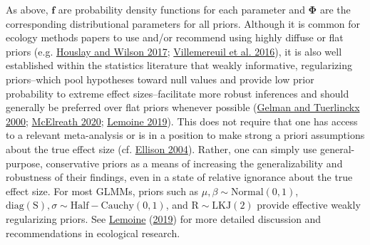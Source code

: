 \documentclass{article}
\begin{document}
As above, \(\boldsymbol{f}\) are probability density functions for each
parameter and \(\boldsymbol{\Phi}\) are the corresponding distributional
parameters for all priors. Although it is common for ecology methods
papers to use and/or recommend using highly diffuse or flat priors (e.g.
\protect\hyperlink{ref-Hous2017}{Houslay and Wilson 2017};
\protect\hyperlink{ref-Vill2016}{Villemereuil et al. 2016}), it is also
well established within the statistics literature that weakly
informative, regularizing priors--which pool hypotheses toward null
values and provide low prior probability to extreme effect
sizes--facilitate more robust inferences and should generally be
preferred over flat priors whenever possible
(\protect\hyperlink{ref-Gelman2000}{Gelman and Tuerlinckx 2000};
\protect\hyperlink{ref-Rethinking}{McElreath 2020};
\protect\hyperlink{ref-Lemoine2019}{Lemoine 2019}). This does not
require that one has access to a relevant meta-analysis or is in a
position to make strong a priori assumptions about the true effect size
(cf. \protect\hyperlink{ref-Ellison2004}{Ellison 2004}). Rather, one can
simply use general-purpose, conservative priors as a means of increasing
the generalizability and robustness of their findings, even in a state
of relative ignorance about the true effect size. For most GLMMs, priors
such as \(\mu,\beta \sim \mathrm{Normal}(0,1)\),
\(\mathrm{diag}(\boldsymbol{\mathrm{S}}),\sigma \sim \mathrm{Half-Cauchy}(0,1)\),
and \(\boldsymbol{\mathrm{R}} \sim \mathrm{LKJ}(2)\) provide effective
weakly regularizing priors. See
\protect\hyperlink{ref-Lemoine2019}{Lemoine}
(\protect\hyperlink{ref-Lemoine2019}{2019}) for more detailed discussion
and recommendations in ecological research.
\end{document}
